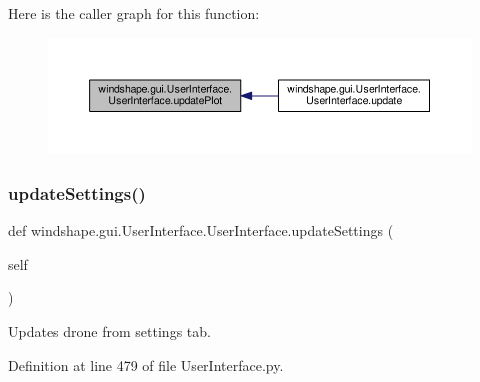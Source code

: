 Here is the caller graph for this function\+:\nopagebreak
\begin{figure}[H]
\begin{center}
\leavevmode
\includegraphics[width=350pt]{classwindshape_1_1gui_1_1_user_interface_1_1_user_interface_a492252a536a8bc6328e97189dbf8ecbc_icgraph}
\end{center}
\end{figure}
\mbox{\label{classwindshape_1_1gui_1_1_user_interface_1_1_user_interface_a0c45babf6fcb71ad8ffe53dbecf07e99}} 
\subsubsection{\texorpdfstring{update\+Settings()}{updateSettings()}}
{\footnotesize\ttfamily def windshape.\+gui.\+User\+Interface.\+User\+Interface.\+update\+Settings (\begin{DoxyParamCaption}\item[{}]{self }\end{DoxyParamCaption})}

\begin{DoxyVerb}Updates drone from settings tab.\end{DoxyVerb}
 

Definition at line 479 of file User\+Interface.\+py.


